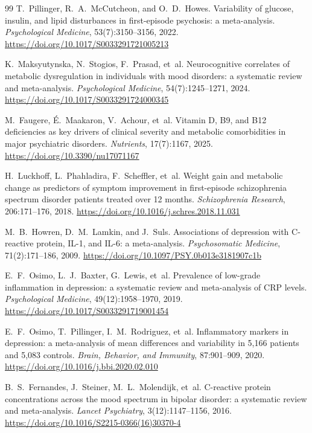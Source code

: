 \begin{thebibliography}{99}
 T.~Pillinger, R.~A.~McCutcheon, and O.~D.~Howes.
\newblock Variability of glucose, insulin, and lipid disturbances in first-episode psychosis: a meta-analysis.
\emph{Psychological Medicine}, 53(7):3150--3156, 2022. \newblock \url{https://doi.org/10.1017/S0033291721005213}

 K.~Maksyutynska, N.~Stogios, F.~Prasad, et~al.
\newblock Neurocognitive correlates of metabolic dysregulation in individuals with mood disorders: a systematic
review and meta-analysis. \emph{Psychological Medicine}, 54(7):1245--1271, 2024.
\newblock \url{https://doi.org/10.1017/S0033291724000345}

 M.~Faugere, \'E.~Maakaron, V.~Achour, et~al.
\newblock Vitamin D, B9, and B12 deficiencies as key drivers of clinical severity and metabolic comorbidities
in major psychiatric disorders. \emph{Nutrients}, 17(7):1167, 2025. \newblock \url{https://doi.org/10.3390/nu17071167}

 H.~Luckhoff, L.~Phahladira, F.~Scheffler, et~al.
\newblock Weight gain and metabolic change as predictors of symptom improvement in first-episode schizophrenia
spectrum disorder patients treated over 12 months. \emph{Schizophrenia Research}, 206:171--176, 2018.
\newblock \url{https://doi.org/10.1016/j.schres.2018.11.031}

 M.~B.~Howren, D.~M.~Lamkin, and J.~Suls.
\newblock Associations of depression with C-reactive protein, IL-1, and IL-6: a meta-analysis.
\emph{Psychosomatic Medicine}, 71(2):171--186, 2009. \newblock \url{https://doi.org/10.1097/PSY.0b013e3181907c1b}

 E.~F.~Osimo, L.~J.~Baxter, G.~Lewis, et~al.
\newblock Prevalence of low-grade inflammation in depression: a systematic review and meta-analysis of CRP
levels. \emph{Psychological Medicine}, 49(12):1958--1970, 2019. \newblock \url{https://doi.org/10.1017/S0033291719001454}

 E.~F.~Osimo, T.~Pillinger, I.~M.~Rodriguez, et~al.
\newblock Inflammatory markers in depression: a meta-analysis of mean differences and variability in 5,166
patients and 5,083 controls. \emph{Brain, Behavior, and Immunity}, 87:901--909, 2020.
\newblock \url{https://doi.org/10.1016/j.bbi.2020.02.010}

 B.~S.~Fernandes, J.~Steiner, M.~L.~Molendijk, et~al.
\newblock C-reactive protein concentrations across the mood spectrum in bipolar disorder: a systematic review
and meta-analysis. \emph{Lancet Psychiatry}, 3(12):1147--1156, 2016.
\newblock \url{https://doi.org/10.1016/S2215-0366(16)30370-4}


\end{thebibliography}
